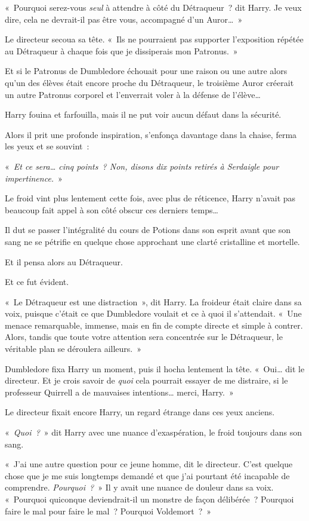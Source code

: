 «~Pourquoi serez-vous \emph{seul} à attendre à côté du Détraqueur~? dit Harry.
Je veux dire, cela ne devrait-il pas être vous, accompagné d'un Auror…~»

Le directeur secoua sa tête.
«~Ils ne pourraient pas supporter l'exposition répétée au Détraqueur à chaque fois que je dissiperais mon Patronus.~»

Et si le Patronus de Dumbledore échouait pour une raison ou une autre alors qu'un des élèves était encore proche du Détraqueur, le troisième Auror créerait un autre Patronus corporel et l'enverrait voler à la défense de l'élève…

Harry fouina et farfouilla, mais il ne put voir aucun défaut dans la sécurité.

Alors il prit une profonde inspiration, s'enfonça davantage dans la chaise, ferma les yeux et se souvint~:

«~\emph{Et ce sera… cinq points~?
Non, disons dix points retirés à Serdaigle pour impertinence.}~»

Le froid vint plus lentement cette fois, avec plus de réticence, Harry n'avait pas beaucoup fait appel à son côté obscur ces derniers temps…

Il dut se passer l'intégralité du cours de Potions dans son esprit avant que son sang ne se pétrifie en quelque chose approchant une clarté cristalline et mortelle.

Et il pensa alors au Détraqueur.

Et ce fut évident.

«~Le Détraqueur est une distraction~», dit Harry.
La froideur était claire dans sa voix, puisque c'était ce que Dumbledore voulait et ce à quoi il s'attendait.
«~Une menace remarquable, immense, mais en fin de compte directe et simple à contrer.
Alors, tandis que toute votre attention sera concentrée sur le Détraqueur, le véritable plan se déroulera ailleurs.~»

Dumbledore fixa Harry un moment, puis il hocha lentement la tête.
«~Oui… dit le directeur.
Et je crois savoir de \emph{quoi} cela pourrait essayer de me distraire, si le professeur Quirrell a de mauvaises intentions… merci, Harry.~»

Le directeur fixait encore Harry, un regard étrange dans ces yeux anciens.

«~\emph{Quoi~?}~» dit Harry avec une nuance d'exaspération, le froid toujours dans son sang.

«~J'ai une autre question pour ce jeune homme, dit le directeur.
C'est quelque chose que je me suis longtemps demandé et que j'ai pourtant été incapable de comprendre.
\emph{Pourquoi~?}~» Il y avait une nuance de douleur dans sa voix.
«~Pourquoi quiconque deviendrait-il un monstre de façon délibérée~?
Pourquoi faire le mal pour faire le mal~?
Pourquoi Voldemort~?~»

